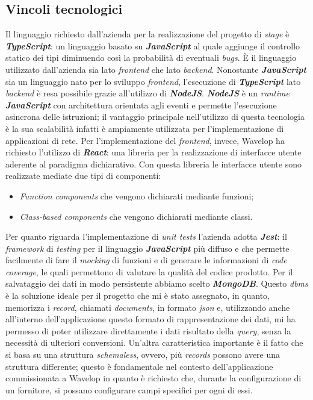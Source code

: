 \subsection{Vincoli tecnologici}
Il linguaggio richiesto dall'azienda per la realizzazione del progetto di \emph{stage} è \emph{\textbf{TypeScript}}: un linguaggio basato su \emph{\textbf{JavaScript}} al quale aggiunge il controllo statico dei tipi diminuendo così la probabilità di eventuali \emph{bugs}. 
È il linguaggio utilizzato dall'azienda sia lato \emph{\gls{frontend}} che lato \emph{\gls{backend}}. 
Nonostante \emph{\textbf{JavaScript}} sia un linguaggio nato per lo sviluppo \emph{frontend}, l'esecuzione di \emph{\textbf{TypeScript}} lato \emph{backend} è resa possibile grazie all'utilizzo di \emph{\textbf{NodeJS}}. 
\emph{\textbf{NodeJS}} è un \emph{runtime \textbf{JavaScript}} con architettura orientata agli eventi e permette l'esecuzione asincrona delle istruzioni; il vantaggio principale nell'utilizzo di questa tecnologia è la sua scalabilità infatti è ampiamente utilizzata per l'implementazione di applicazioni di rete. 
Per l'implementazione del \emph{frontend}, invece, Wavelop ha richiesto l'utilizzo di \emph{\textbf{React}}: una libreria per la realizzazione di interfacce utente aderente al paradigma dichiarativo. 
Con questa libreria le interfacce utente sono realizzate mediate due tipi di componenti: 
\begin{itemize}
  \item \emph{Function components} che vengono dichiarati mediante funzioni;
  \item \emph{Class-based components} che vengono dichiarati mediante classi.
\end{itemize}
Per quanto riguarda l'implementazione di \emph{unit tests} l'azienda adotta \emph{\textbf{Jest}}: il \emph{framework} di \emph{testing} per il linguaggio \emph{\textbf{JavaScript}} più diffuso e che permette facilmente di fare il \emph{mocking} di funzioni e di generare le informazioni di \emph{code coverage}, le quali permettono di valutare la qualità del codice prodotto.
Per il salvataggio dei dati in modo persistente abbiamo scelto \emph{\textbf{MongoDB}}. 
Questo \emph{\acrshort{dbms}} è la soluzione ideale per il progetto che mi è stato assegnato, in quanto, memorizza i \emph{record}, chiamati \emph{documents}, in formato \emph{\acrshort{json}} e, utilizzando anche all'interno dell'applicazione questo formato di rappresentazione dei dati, mi ha permesso di poter utilizzare direttamente i dati risultato della \emph{query}, senza la necessità di ulteriori conversioni. 
Un'altra caratteristica importante è il fatto che si basa su una struttura \emph{schemaless}, ovvero, più \emph{records} possono avere una struttura differente; questo è fondamentale nel contesto dell'applicazione commissionata a Wavelop in quanto è richiesto che, durante la configurazione di un fornitore, si possano configurare campi specifici per ogni di essi.

